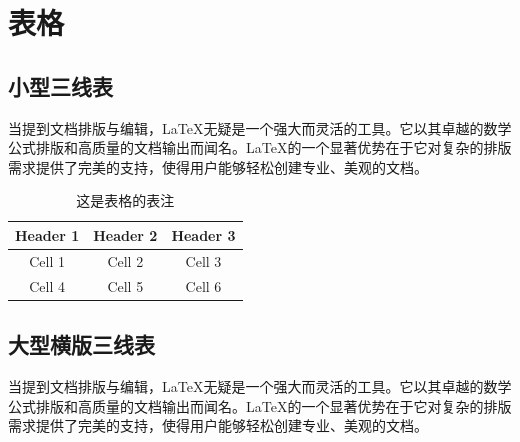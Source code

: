 \documentclass[AutoFakeBold,a4paper]{ctexart}
\begin{document}
\section{表格}

\subsection{小型三线表}


当提到文档排版与编辑，LaTeX无疑是一个强大而灵活的工具。它以其卓越的数学公式排版和高质量的文档输出而闻名。LaTeX的一个显著优势在于它对复杂的排版需求提供了完美的支持，使得用户能够轻松创建专业、美观的文档。

\begin{table}[htbp]
    \centering
    \caption{这是表格的表注}
    \begin{tabular}{ccc}
        \toprule
        Header 1 & Header 2 & Header 3 \\
        \midrule
        Cell 1 & Cell 2 & Cell 3 \\
        Cell 4 & Cell 5 & Cell 6 \\
        \bottomrule
    \end{tabular}
    \label{tab:mytable}
\end{table}

\subsection{大型横版三线表}


当提到文档排版与编辑，LaTeX无疑是一个强大而灵活的工具。它以其卓越的数学公式排版和高质量的文档输出而闻名。LaTeX的一个显著优势在于它对复杂的排版需求提供了完美的支持，使得用户能够轻松创建专业、美观的文档。
\end{document}
